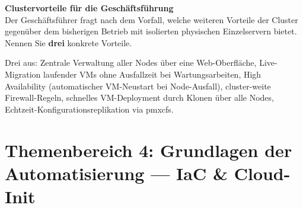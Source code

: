 \documentclass[a4paper,10pt,addpoints]{exam}
\begin{document}
\begin{questions}
\question[3]
\textbf{Clustervorteile für die Geschäftsführung}\\
Der Geschäftsführer fragt nach dem Vorfall, welche weiteren Vorteile der Cluster
gegenüber dem bisherigen Betrieb mit isolierten physischen Einzelservern bietet.
Nennen Sie \textbf{drei} konkrete Vorteile.
\fillwithdottedlines{0.9in}
\begin{solution}
  Drei aus: Zentrale Verwaltung aller Nodes über eine Web-Oberfläche,
  Live-Migration laufender VMs ohne Ausfallzeit bei Wartungsarbeiten,
  High Availability (automatischer VM-Neustart bei Node-Ausfall),
  cluster-weite Firewall-Regeln, schnelles VM-Deployment durch Klonen
  über alle Nodes, Echtzeit-Konfigurationsreplikation via pmxcfs.
\end{solution}
\end{questions}

\section*{Themenbereich 4: Grundlagen der Automatisierung --- IaC \& Cloud-Init}
\end{document}
